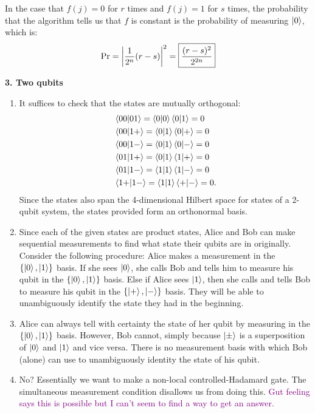 \documentclass{article}
\theoremstyle{definition}
\newcommand{\f}[2]{\frac{#1}{#2}}
\begin{document}
In the case that $f(j) = 0$ for $r$ times and $f(j)=1$ for $s$ times, the probability that the algorithm tells us that $f$ is constant is the probability of measuring $\ket{0}$, which is:
\begin{align*}
	\Pr = \abs{\f{1}{2^n} (r-s)   }^2 = \boxed{\f{(r-s)^2}{2^{2n}}}
\end{align*}

\newpage

\noindent \textbf{3. Two qubits}

\begin{enumerate}[label=(\alph*)]
	\item It suffices to check that the states are mutually orthogonal:
	\begin{align*}
		&\bra{00}\ket{01} = \braket{0}\bra{0}\ket{1} = 0\\
		&\bra{00}\ket{1+} = \bra{0}\ket{1}\bra{0}\ket{+} = 0 \\
		&\bra{00}\ket{1-} = \bra{0}\ket{1}\bra{0}\ket{-} = 0\\
		&\bra{01}\ket{1+} = \bra{0}\ket{1}\bra{1}\ket{+} = 0 \\
		&\bra{01}\ket{1-} = \bra{1}\ket{1}\bra{1}\ket{-} = 0\\
		&\bra{1+}\ket{1-} = \bra{1}\ket{1}\bra{+}\ket{-} =0. 
	\end{align*}
	Since the states also span the 4-dimensional Hilbert space for states of a 2-qubit system, the states provided form an orthonormal basis. 
	
	\item Since each of the given states are product states, Alice and Bob can make sequential measurements to find what state their qubits are in originally. Consider the following procedure: Alice makes a measurement in the $\{\ket{0},\ket{1}\}$ basis. If she sees $\ket{0}$, she calls Bob and tells him to measure his qubit in the $\{\ket{0}, \ket{1}\}$ basis. Else if Alice sees $\ket{1}$, then she calls and tells Bob to measure his qubit in the $\{ \ket{+}, \ket{-}  \}$ basis. They will be able to unambiguously identify the state they had in the beginning.
	
	\item Alice can always tell with certainty the state of her qubit by measuring in the $\{  \ket{0},\ket{1} \}$ basis. However, Bob cannot, simply because $\ket{\pm}$ is a superposition of $\ket{0}$ and $\ket{1}$ and vice versa. There is no measurement basis with which Bob (alone) can use to unambiguously identity the state of his qubit.  
	
	\item No? Essentially we want to make a non-local controlled-Hadamard gate. The simultaneous measurement condition disallows us from doing this. \textcolor{purple}{Gut feeling says this is possible but I can't seem to find a way to get an answer.}
\end{enumerate}
\end{document}

